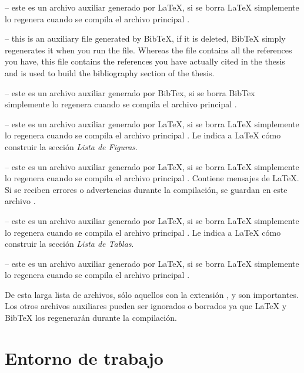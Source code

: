  -- este es un archivo auxiliar generado por \LaTeX{}, si se borra \LaTeX{} simplemente lo regenera cuando se compila el archivo principal .

 -- this is an auxiliary file generated by BibTeX, if it is deleted, BibTeX simply regenerates it when you run the  file. Whereas the  file contains all the references you have, this  file contains the references you have actually cited in the thesis and is used to build the bibliography section of the thesis.

 -- este es un archivo auxiliar generado por BibTex, si se borra BibTex simplemente lo regenera cuando se compila el archivo principal .

 -- este es un archivo auxiliar generado por \LaTeX{}, si se borra \LaTeX{} simplemente lo regenera cuando se compila el archivo principal .  Le indica a \LaTeX{} cómo construir la sección \emph{Lista de Figuras}.
 
 --  este es un archivo auxiliar generado por \LaTeX{}, si se borra \LaTeX{} simplemente lo regenera cuando se compila el archivo principal . Contiene mensajes de \LaTeX{}. Si se reciben errores o advertencias durante la compilación, se guardan en este archivo .

 -- este es un archivo auxiliar generado por \LaTeX{}, si se borra \LaTeX{} simplemente lo regenera cuando se compila el archivo principal .  Le indica a \LaTeX{} cómo construir la sección \emph{Lista de Tablas}.

 -- este es un archivo auxiliar generado por \LaTeX{}, si se borra \LaTeX{} simplemente lo regenera cuando se compila el archivo principal .

De esta larga lista de archivos, sólo aquellos con la extensión ,  y  son importantes.  Los otros archivos auxiliares pueden ser ignorados o borrados ya que \LaTeX{} y BibTeX los regenerarán durante la compilación.


\section{Entorno de trabajo}


